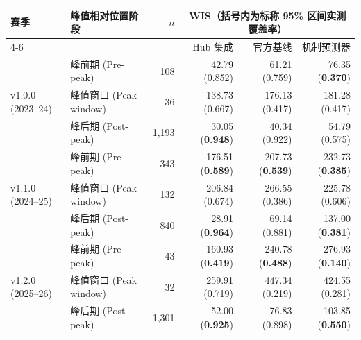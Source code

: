 \begin{tabular}{@{}llrrrr@{}}
\toprule
赛季 & 峰值相对位置阶段 & $n$ & \multicolumn{3}{c}{WIS（括号内为标称 95\% 区间实测覆盖率）} \\
\cmidrule(lr){4-6}
& & & Hub 集成 & 官方基线 & 机制预测器 \\
\midrule
\multirow{3}{*}{v1.0.0 (2023--24)}
& 峰前期 (Pre-peak) & 108 & 42.79 (0.852) & 61.21 (0.759) & 76.35 (\textbf{0.370}) \\
& 峰值窗口 (Peak window) & 36 & 138.73 (0.667) & 176.13 (0.417) & 181.28 (0.417) \\
& 峰后期 (Post-peak) & 1,193 & 30.05 (\textbf{0.948}) & 40.34 (0.922) & 54.79 (0.575) \\
\midrule
\multirow{3}{*}{v1.1.0 (2024--25)}
& 峰前期 (Pre-peak) & 343 & 176.51 (\textbf{0.589}) & 207.73 (\textbf{0.539}) & 232.73 (\textbf{0.385}) \\
& 峰值窗口 (Peak window) & 132 & 206.84 (0.674) & 266.55 (0.386) & 225.78 (0.606) \\
& 峰后期 (Post-peak) & 840 & 28.91 (\textbf{0.964}) & 69.14 (0.881) & 137.00 (\textbf{0.381}) \\
\midrule
\multirow{3}{*}{v1.2.0 (2025--26)}
& 峰前期 (Pre-peak) & 43 & 160.93 (\textbf{0.419}) & 240.78 (\textbf{0.488}) & 276.93 (\textbf{0.140}) \\
& 峰值窗口 (Peak window) & 32 & 259.91 (0.719) & 447.34 (0.219) & 424.55 (0.281) \\
& 峰后期 (Post-peak) & 1,301 & 52.00 (\textbf{0.925}) & 76.83 (0.898) & 103.85 (\textbf{0.550}) \\
\bottomrule
\end{tabular}
